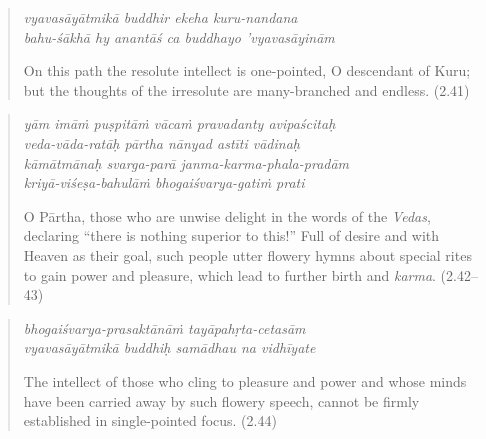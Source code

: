 \documentclass[12pt, twoside, openright]{memoir}
\begin{document}
\par
\begin{verse}
\textit{vyavasāyātmikā buddhir ekeha kuru-nandana} \\
\textit{bahu-śākhā hy anantāś ca buddhayo ’vyavasāyinām}

\noindent On this path the resolute intellect is one-pointed, O descendant of Kuru; but the thoughts of the irresolute are many-branched and endless. (2.41)
\end{verse}
\par



\par
\begin{verse}
\textit{yām imāṁ puṣpitāṁ vācaṁ pravadanty avipaścitaḥ} \\
\textit{veda-vāda-ratāḥ pārtha nānyad astīti vādinaḥ} \\
\textit{kāmātmānaḥ svarga-parā janma-karma-phala-pradām} \\
\textit{kriyā-viśeṣa-bahulāṁ bhogaiśvarya-gatiṁ prati}

\noindent O Pārtha, those who are unwise delight in the words of the \textit{Vedas}, declaring \enquote{there is nothing superior to this!} Full of desire and with Heaven as their goal, such people utter flowery hymns about special rites to gain power and pleasure, which lead to further birth and \textit{karma}. (2.42–43)
\end{verse}
\par



\par
\begin{verse}
\textit{bhogaiśvarya-prasaktānāṁ tayāpahṛta-cetasām} \\
\textit{vyavasāyātmikā buddhiḥ samādhau na vidhīyate}

\noindent The intellect of those who cling to pleasure and power and whose minds have been carried away by such flowery speech, cannot be firmly established in single-pointed focus. (2.44)
\end{verse}
\par
\end{document}

